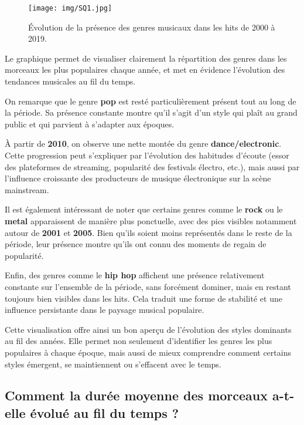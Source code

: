 \documentclass[french]{article}
\newcommand{\newLine}{\vspace{0.2cm}}
\begin{document}
\begin{figure}[h]
	\centering
	\texttt{[image: img/SQ1.jpg]} %
	\caption{Évolution de la présence des genres musicaux dans les hits de 2000 à 2019.}
	\label{fig:renforcement}
\end{figure}

Le graphique permet de visualiser clairement la répartition des genres dans les morceaux les plus populaires chaque année, et met en évidence l'évolution des tendances musicales au fil du temps. \newLine

On remarque que le genre \textbf{pop} est resté particulièrement présent tout au long de la période. Sa présence constante montre qu'il s'agit d'un style qui plaît au grand public et qui parvient à s'adapter aux époques. \newLine

À partir de \textbf{2010}, on observe une nette montée du genre \textbf{dance/electronic}. Cette progression peut s'expliquer par l'évolution des habitudes d'écoute (essor des plateformes de streaming, popularité des festivals électro, etc.), mais aussi par l'influence croissante des producteurs de musique électronique sur la scène mainstream. \newLine

Il est également intéressant de noter que certains genres comme le \textbf{rock} ou le \textbf{metal} apparaissent de manière plus ponctuelle, avec des pics visibles notamment autour de \textbf{2001} et \textbf{2005}. Bien qu'ils soient moins représentés dans le reste de la période, leur présence montre qu'ils ont connu des moments de regain de popularité. \newLine

Enfin, des genres comme le \textbf{hip hop} affichent une présence relativement constante sur l'ensemble de la période, sans forcément dominer, mais en restant toujours bien visibles dans les hits. Cela traduit une forme de stabilité et une influence persistante dans le paysage musical populaire. \newLine

Cette visualisation offre ainsi un bon aperçu de l'évolution des styles dominants au fil des années. Elle permet non seulement d'identifier les genres les plus populaires à chaque époque, mais aussi de mieux comprendre comment certains styles émergent, se maintiennent ou s'effacent avec le temps. \newLine \newLine \newLine



\clearpage
\subsection{Comment la durée moyenne des morceaux a-t-elle évolué au fil du temps ?}
\end{document}
